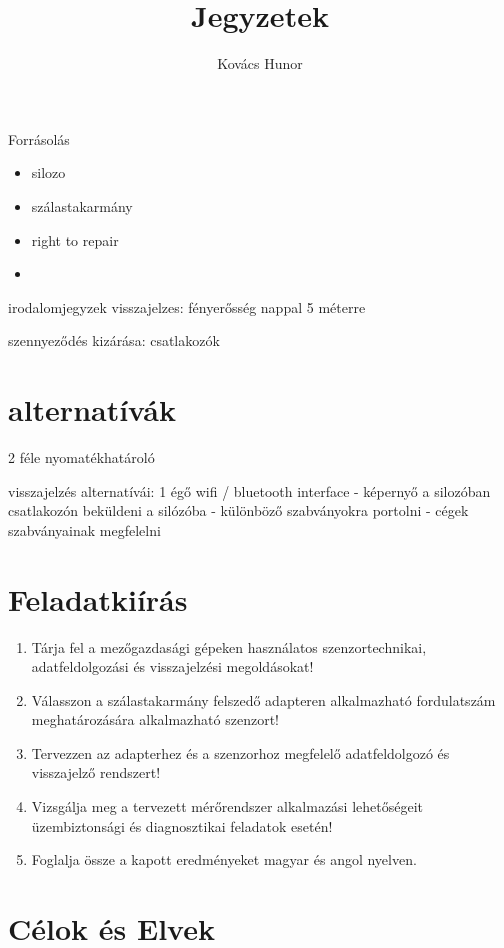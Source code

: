 \documentclass{article}
\title{Jegyzetek}
\author{Kovács Hunor}
\begin{document}
	\maketitle
	
	Forrásolás
	\begin{itemize}
		\item silozo
		\item szálastakarmány
		\item right to repair
		\item 
	\end{itemize}
	
	irodalomjegyzek
	visszajelzes:
	fényerősség nappal 5 méterre
	
	szennyeződés kizárása:
	csatlakozók
	
	
	\section{alternatívák}
	
	2 féle nyomatékhatároló
	
	visszajelzés alternatívái:
	1 égő
	wifi / bluetooth interface - képernyő a silozóban
	csatlakozón beküldeni a silózóba - különböző szabványokra portolni - cégek szabványainak megfelelni
	
	\section{Feladatkiírás}
	
	\begin{enumerate}
		
		\item Tárja fel a mezőgazdasági gépeken használatos szenzortechnikai, adatfeldolgozási és visszajelzési megoldásokat!
		\item Válasszon a szálastakarmány felszedő adapteren alkalmazható fordulatszám meghatározására alkalmazható szenzort!
		\item Tervezzen az adapterhez és a szenzorhoz megfelelő adatfeldolgozó és visszajelző rendszert!
		\item Vizsgálja meg a tervezett mérőrendszer alkalmazási lehetőségeit üzembiztonsági és diagnosztikai feladatok esetén!
		\item Foglalja össze a kapott eredményeket magyar és angol nyelven.
	\end{enumerate}
	
	\section{Célok és Elvek}
	
\end{document}
